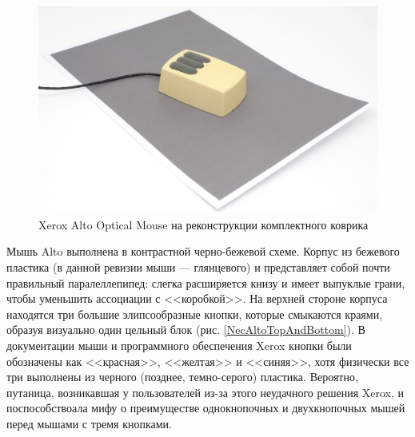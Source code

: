 \documentclass[11pt, a4paper]{article}
\begin{document}
\begin{figure}[h]
    \centering
    \includegraphics[scale=0.4]{1981_xerox_alto_mouse/pad_30.jpg}
    \caption{Xerox Alto Optical Mouse на реконструкции комплектного коврика}
    \label{fig:XeroxAltoPad}
\end{figure}

Мышь Alto выполнена в контрастной черно-бежевой схеме.
Корпус из бежевого пластика (в данной ревизии мыши --- глянцевого) и представляет собой почти правильный паралеллепипед: слегка расширяется книзу и имеет выпуклые грани, чтобы уменьшить ассоциации с <<коробкой>>. На верхней стороне корпуса находятся три большие элипсообразные кнопки, которые смыкаются краями, образуя визуально один цельный блок (рис. \ref{NecAltoTopAndBottom}).  В документации мыши и программного обеспечения Xerox кнопки были обозначены как <<красная>>, <<желтая>> и <<синяя>>, хотя физически все три выполнены из черного (позднее, темно-серого) пластика. Вероятно, путаница, возникавшая у пользователей из-за этого неудачного решения Xerox, и поспособствоала мифу о преимуществе однокнопочных и двухкнопочных мышей перед мышами с тремя кнопками.
\end{document}
